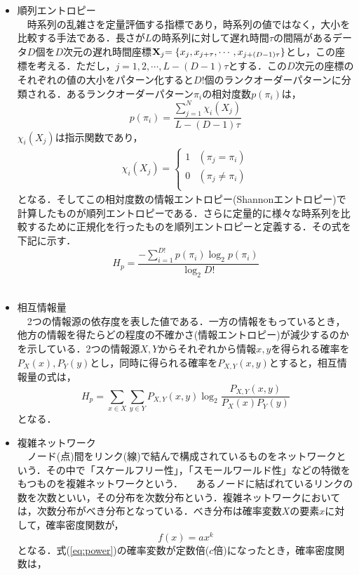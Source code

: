 \documentclass[autodetect-engine,dvipdfmx-if-dvi,ja=standard,a4paper,11pt]{bxjsarticle} %
\begin{document}
\begin{itemize}
\item 順列エントロピー\\%
　時系列の乱雑さを定量評価する指標であり，時系列の値ではなく，大小を比較する手法である．長さが$L$の時系列に対して遅れ時間$\tau$の間隔があるデータ$D$個を$D$次元の遅れ時間座標${\bf X}_{\sl j}{\sl=\{ x_j,x_{j+\tau},\cdots ,x_{j+(D-1)\tau} \}} $とし，この座標を考える．ただし，$j=1,2,\cdots,L-(D-1)\tau$とする．この$D$次元の座標のそれぞれの値の大小をパターン化すると$D!$個のランクオーダーパターンに分類される．あるランクオーダーパターン$\pi_i$の相対度数$p(\pi_i)$は，
\begin{equation}
p(\pi_i)=\dfrac{\displaystyle\sum^N_{j=1}\chi_i(X_j)}{L-(D-1)\tau}
\end{equation}
$\chi_i(X_j)$は指示関数であり，
\begin{eqnarray}
\chi_i(X_j)=\left\{ \begin{array}{ll}
1 &  (\pi_j=\pi_i) \\
0 & (\pi_j\neq\pi_i) \\
\end{array} \right.
\end{eqnarray}
となる．そしてこの相対度数の情報エントロピー(Shannonエントロピー)で計算したものが順列エントロピーである．さらに定量的に様々な時系列を比較するために正規化を行ったものを順列エントロピーと定義する．その式を下記に示す．
\begin{equation}
H_p=\dfrac{-\displaystyle\sum_{i=1}^{D!} p(\pi_i) \log_2 p(\pi_i)}{\log_2 D!}
\end{equation}
\\

\item 相互情報量\\%
　2つの情報源の依存度を表した値である．一方の情報をもっているとき，他方の情報を得たらどの程度の不確かさ(情報エントロピー)が減少するのかを示している．2つの情報源$X,Y$からそれぞれから情報$x,y$を得られる確率を$P_X(x),P_Y(y)$とし，同時に得られる確率を$P_{X,Y}(x,y)$とすると，相互情報量の式は，
\begin{equation}
H_p=\displaystyle\sum_{x\in X}\displaystyle\sum_{y\in Y} P_{X,Y}(x,y) \log_2 \dfrac{P_{X,Y}(x,y)}{P_X(x)P_Y(y)}
\end{equation}
となる\cite{mutual}．
　
\\

\item 複雑ネットワーク\cite{net} \\%
　ノード(点)間をリンク(線)で結んで構成されているものをネットワークという．その中で「スケールフリー性」，「スモールワールド性」などの特徴をもつものを複雑ネットワークという．
　あるノードに結ばれているリンクの数を次数といい，その分布を次数分布という．複雑ネットワークにおいては，次数分布がべき分布となっている．べき分布は確率変数$X$の要素$x$に対して，確率密度関数が，
\begin{equation}
\label{eq:power}
f(x)=ax^k
\end{equation}
となる．式(\ref{eq:power})の確率変数が定数倍($c$倍)になったとき，確率密度関数は，


\end{itemize}
\end{document}
